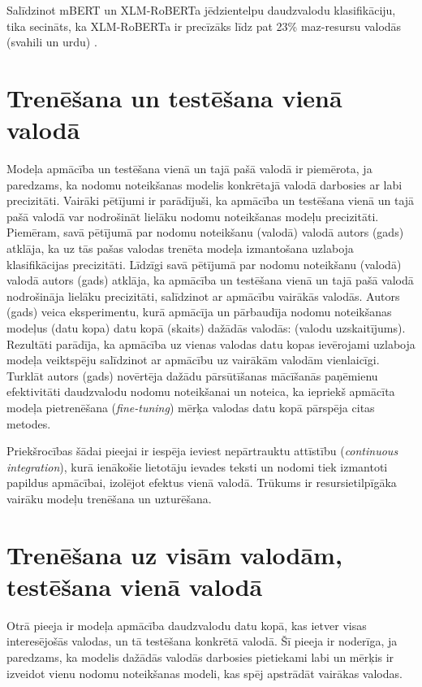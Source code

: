 Salīdzinot mBERT un XLM-RoBERTa jēdzientelpu daudzvalodu klasifikāciju, tika secināts, ka XLM-RoBERTa ir precīzāks līdz pat 23\% maz-resursu valodās (svahili un urdu) \cite{conneau2020}.


\section{Trenēšana un testēšana vienā valodā}

Modeļa apmācība un testēšana vienā un tajā pašā valodā ir piemērota, ja paredzams, ka nodomu noteikšanas modelis konkrētajā valodā darbosies ar labi precizitāti. Vairāki pētījumi ir parādījuši, ka apmācība un testēšana vienā un tajā pašā valodā var nodrošināt lielāku nodomu noteikšanas modeļu precizitāti. Piemēram, savā pētījumā par nodomu noteikšanu (valodā) valodā autors (gads) atklāja, ka uz tās pašas valodas trenēta modeļa izmantošana uzlaboja klasifikācijas precizitāti. Līdzīgi savā pētījumā par nodomu noteikšanu (valodā) valodā autors (gads) atklāja, ka apmācība un testēšana vienā un tajā pašā valodā nodrošināja lielāku precizitāti, salīdzinot ar apmācību vairākās valodās. Autors (gads) veica eksperimentu, kurā apmācīja un pārbaudīja nodomu noteikšanas modeļus (datu kopa) datu kopā (skaits) dažādās valodās: (valodu uzskaitījums). Rezultāti parādīja, ka apmācība uz vienas valodas datu kopas ievērojami uzlaboja modeļa veiktspēju salīdzinot ar apmācību uz vairākām valodām vienlaicīgi. Turklāt autors (gads) novērtēja dažādu pārsūtīšanas mācīšanās paņēmienu efektivitāti daudzvalodu nodomu noteikšanai un noteica, ka iepriekš apmācīta modeļa pietrenēšana (\textit{fine-tuning}) mērķa valodas datu kopā pārspēja citas metodes.

Priekšrocības šādai pieejai ir iespēja ieviest nepārtrauktu attīstību (\textit{continuous integration}), kurā ienākošie lietotāju ievades teksti un nodomi tiek izmantoti papildus apmācībai, izolējot efektus vienā valodā. Trūkums ir resursietilpīgāka vairāku modeļu trenēšana un uzturēšana.

\section{Trenēšana uz visām valodām, testēšana vienā valodā}

Otrā pieeja ir modeļa apmācība daudzvalodu datu kopā, kas ietver visas interesējošās valodas, un tā testēšana konkrētā valodā. Šī pieeja ir noderīga, ja paredzams, ka modelis dažādās valodās darbosies pietiekami labi un mērķis ir izveidot vienu nodomu noteikšanas modeli, kas spēj apstrādāt vairākas valodas. 

